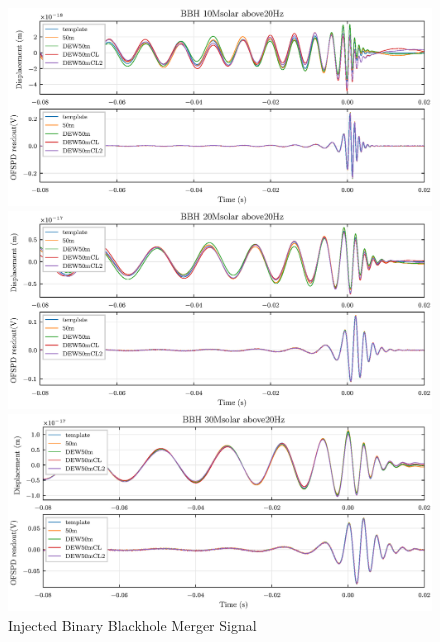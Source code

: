 \begin{figure}[hbt!]
\centering
\includegraphics[width=\textwidth]{figure/inj/10.eps}


\includegraphics[width=\textwidth]{figure/inj/20.eps}


\includegraphics[width=\textwidth]{figure/inj/30.eps}
\caption{Injected Binary Blackhole Merger Signal}\label{fig:bbhinj}
\end{figure}




